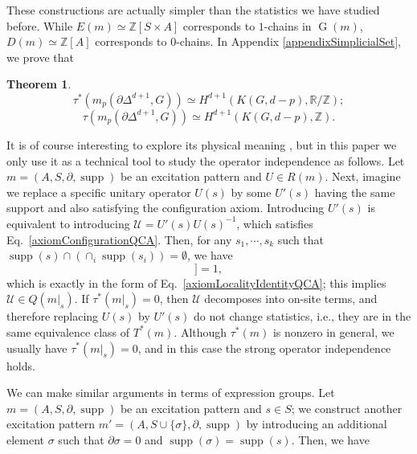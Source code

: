 \documentclass[reprint, amsmath, amssymb, showpacs, floatfix, longbibliography, aps, twocolumn, superscriptaddress, nofootinbib]{revtex4-2}
\newcommand{\ZZ}{{\mathbb Z}}
\newcommand{\RR}{{\mathbb R}}
\newcommand{\supp}{\operatorname{supp}}
\theoremstyle{definition}
\newtheorem{theorem}{Theorem}[section]
\begin{document}
These constructions are actually simpler than the statistics we have studied before. While $E(m)\simeq \ZZ[S\times A]$ corresponds to $1$-chains in $\operatorname{G}(m)$, $D(m)\simeq \ZZ[A]$ corresponds to $0$-chains. In Appendix \ref{appendixSimplicialSet}, we prove that
\begin{theorem}\label{thmTau}
	\begin{equation}
		\tau^*(m_p(\partial\Delta^{d+1},G))\simeq H^{d+1}(K(G,d-p),\RR/\ZZ);
	\end{equation}
	\begin{equation}
		\tau(m_p(\partial\Delta^{d+1},G))\simeq H^{d+1}(K(G,d-p),\ZZ).
	\end{equation}
\end{theorem}
It is of course interesting to explore its physical meaning \cite{CarolynZhangSPTEntangler}, but in this paper we only use it as a technical tool to study the operator independence as follows. Let $m=(A,S,\partial,\supp)$ be an excitation pattern and $U\in R(m)$. Next, imagine we replace a specific unitary operator $U(s)$ by some $U'(s)$ having the same support and also satisfying the configuration axiom. Introducing $U'(s)$ is equivalent to introducing $\mathcal{U}=U'(s)U(s)^{-1}$, which satisfies Eq.~\eqref{axiomConfigurationQCA}. Then, for any $s_1,\cdots,s_k$ such that $\supp(s)\cap (\cap_i\supp(s_i))=\emptyset$, we have 
\begin{equation}
	[U(s_k),\cdots,[U(s_1),\mathcal{U}]]=1,
\end{equation}
which is exactly in the form of Eq.~\eqref{axiomLocalityIdentityQCA}; this implies $\mathcal{U}\in Q(m|_s)$. If $\tau^*(m|_s)=0$, then $\mathcal{U}$ decomposes into on-site terms, and therefore replacing $U(s)$ by $U'(s)$ do not change statistics, i.e., they are in the same equivalence class of $T^*(m)$. Although $\tau^*(m)$ is nonzero in general, we usually have $\tau^*(m|_s)=0$, and in this case the strong operator independence holds.

We can make similar arguments in terms of expression groups. Let $m=(A,S,\partial,\supp)$ be an excitation pattern and $s\in S$; we construct another excitation pattern $m'=(A,S\cup \{\sigma\},\partial,\supp)$ by introducing an additional element $\sigma$ such that $\partial\sigma=0$ and $\supp(\sigma)=\supp(s)$. Then, we have
\end{document}

